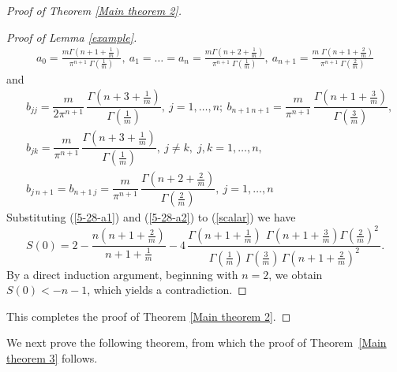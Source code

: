 \documentclass[a4paper,centertags,oneside,12pt]{amsart}
\numberwithin{equation}{section}
\begin{document}
\begin{proof}[Proof of Theorem \ref{Main theorem 2}]
\begin{proof}[Proof of  Lemma \ref{example}]
\begin{equation}
\begin{aligned}
a_0=\frac{m\Gamma\!\left(n +1+ \frac{1}{m}\right)}{\pi^{n+1} \; \Gamma\!\left(\frac{1}{m}\right)},~
a_1=\dots=a_{n}=\frac{m\Gamma\!\left(n +2+ \frac{1}{m}\right)}{\pi^{n+1} \; \Gamma\!\left(\frac{1}{m}\right)},~ 
a_{n+1}=\frac{m\;\Gamma\!\left(n+1+\frac{2}{m}\right)}{\pi^{n+1} \; \Gamma\!\left(\frac{2}{m}\right)}
\end{aligned}
\end{equation}
and 
\begin{equation}\label{5-28-a2}
\begin{split}
&b_{jj}=\dfrac{m}{2\pi^{n+1}}\,\dfrac{\Gamma\!\left(n+3+\frac1m\right)}{\Gamma\!\left(\frac1m\right)},~ j=1,\dots,n; ~b_{n+1~ n+1}=\dfrac{m}{\pi^{n+1}}\,\dfrac{\Gamma\!\left(n+1+\frac3m\right)}{\Gamma\!\left(\frac3m\right)},\\
&b_{jk}=\dfrac{m}{\pi^{n+1}}\,\dfrac{\Gamma\!\left(n+3+\frac1m\right)}{\Gamma\!\left(\frac1m\right)},~  j\neq k,\; j,k=1,\dots,n,\\
&b_{j~n+1}=b_{n+1~j}=\dfrac{m}{\pi^{n+1}}\,\dfrac{\Gamma\!\left(n+2+\frac2m\right)}{\Gamma\!\left(\frac2m\right)},  ~j=1,\dots,n
\end{split}
 \end{equation}   
Substituting (\ref{5-28-a1}) and (\ref{5-28-a2}) to (\ref{scalar}) we have
\begin{equation}
S(0)=2-\frac{n(n+1+\frac 2m)}{n+1+\frac 1m}
-4\,\frac{\Gamma\!\left(n+1+\frac1m\right)\,\
\Gamma\!\left(n+1+\frac3m\right)\Gamma\!\left(\frac2m\right)^2\,}{\Gamma\!\left(\frac1m\right)\,\Gamma\!\left(\frac3m\right)\,
\Gamma\!\left(n+1+\frac2m\right)^2}.
\end{equation}
By a direct induction argument, beginning with \(n=2\), we obtain \(S(0)<-n-1\), which yields a contradiction.

\end{proof}

























This completes the proof of Theorem \ref{Main theorem 2}. 
\end{proof}
We next prove the following theorem, from  which the proof of Theorem~\ref{Main theorem 3} follows.
\end{document}
